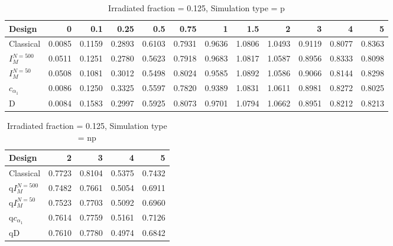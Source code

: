 \documentclass[a4paper]{article}
\begin{document}
\begin{table}[ht]
\centering
\begin{tabular}{lrrrrrrrrrrr}
  \hline
Design & 0 & 0.1 & 0.25 & 0.5 & 0.75 & 1 & 1.5 & 2 & 3 & 4 & 5 \\ 
  \hline
Classical & 0.0085 & 0.1159 & 0.2893 & 0.6103 & 0.7931 & 0.9636 & 1.0806 & 1.0493 & 0.9119 & 0.8077 & 0.8363 \\ 
  $I_M^{N=500}$ & 0.0511 & 0.1251 & 0.2780 & 0.5623 & 0.7918 & 0.9683 & 1.0817 & 1.0587 & 0.8956 & 0.8333 & 0.8098 \\ 
  $I_M^{N=50}$ & 0.0508 & 0.1081 & 0.3012 & 0.5498 & 0.8024 & 0.9585 & 1.0892 & 1.0586 & 0.9066 & 0.8144 & 0.8298 \\ 
  $c_{\alpha_1}$ & 0.0086 & 0.1250 & 0.3325 & 0.5597 & 0.7820 & 0.9389 & 1.0831 & 1.0611 & 0.8981 & 0.8272 & 0.8025 \\ 
  D & 0.0084 & 0.1583 & 0.2997 & 0.5925 & 0.8073 & 0.9701 & 1.0794 & 1.0662 & 0.8951 & 0.8212 & 0.8213 \\ 
   \hline
\end{tabular}
\caption{Irradiated fraction = 0.125, Simulation type = p} 
\end{table}

\begin{table}[ht]
\centering
\begin{tabular}{lrrrr}
  \hline
Design & 2 & 3 & 4 & 5 \\ 
  \hline
Classical & 0.7723 & 0.8104 & 0.5375 & 0.7432 \\ 
  q$I_M^{N=500}$ & 0.7482 & 0.7661 & 0.5054 & 0.6911 \\ 
  q$I_M^{N=50}$ & 0.7523 & 0.7703 & 0.5092 & 0.6960 \\ 
  q$c_{\alpha_1}$ & 0.7614 & 0.7759 & 0.5161 & 0.7126 \\ 
  qD & 0.7610 & 0.7780 & 0.4974 & 0.6842 \\ 
   \hline
\end{tabular}
\caption{Irradiated fraction = 0.125, Simulation type = np} 
\end{table}
\end{document}
